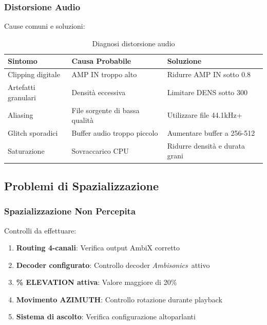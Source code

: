 \documentclass[a4paper,11pt,openany]{book}
\newcommand{\ambisonics}{\textit{Ambisonics}}
\begin{document}
\subsubsection{Distorsione Audio}

Cause comuni e soluzioni:

\begin{table}[H]
    \centering
    \caption{Diagnosi distorsione audio}
    \label{tab:distortion_diagnosis}
    \begin{tabular}{@{}p{3cm}p{5cm}p{5cm}@{}}
        \toprule
        \textbf{Sintomo} & \textbf{Causa Probabile} & \textbf{Soluzione} \\
        \midrule
        Clipping digitale & AMP IN troppo alto & Ridurre AMP IN sotto 0.8 \\
        Artefatti granulari & Densità eccessiva & Limitare DENS sotto 300 \\
        Aliasing & File sorgente di bassa qualità & Utilizzare file 44.1kHz+ \\
        Glitch sporadici & Buffer audio troppo piccolo & Aumentare buffer a 256-512 \\
        Saturazione & Sovraccarico CPU & Ridurre densità e durata grani \\
        \bottomrule
    \end{tabular}
\end{table}

\subsection{Problemi di Spazializzazione}

\subsubsection{Spazializzazione Non Percepita}

Controlli da effettuare:

\begin{enumerate}
    \item \textbf{Routing 4-canali}: Verifica output AmbiX corretto
    \item \textbf{Decoder configurato}: Controllo decoder \ambisonics\ attivo
    \item \textbf{\% ELEVATION attiva}: Valore maggiore di 20\%
    \item \textbf{Movimento AZIMUTH}: Controllo rotazione durante playback
    \item \textbf{Sistema di ascolto}: Verifica configurazione altoparlanti
\end{enumerate}
\end{document}
